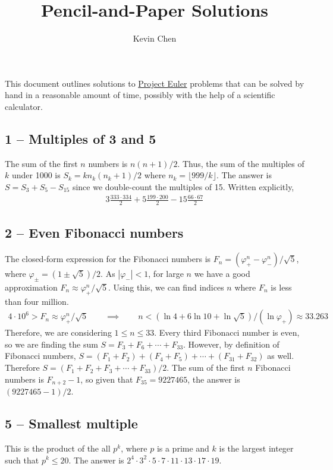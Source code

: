 \documentclass{article}
\title{Pencil-and-Paper Solutions}
\author{Kevin Chen}
\begin{document}
\maketitle

This document outlines solutions to \href{https://projecteuler.net/}{Project Euler} problems that can be solved by hand in a reasonable amount of time, possibly with the help of a scientific calculator. \\

\subsection*{1 -- Multiples of 3 and 5} 
The sum of the first $n$ numbers is $n(n+1)/2$. 
Thus, the sum of the multiples of $k$ under 1000 is $S_k = k n_k(n_k+1)/2$ where $n_k=\lfloor 999/k \rfloor$. 
The answer is $S = S_3 + S_5 - S_{15}$ since we double-count the multiples of 15.
Written explicitly,
\begin{align*}
	\boxed{ 3\frac{333 \cdot 334}{2} + 5\frac{199 \cdot 200}{2} - 15\frac{66 \cdot 67}{2} } 
\end{align*}


\subsection*{2 -- Even Fibonacci numbers} 
The closed-form expression for the Fibonacci numbers is $F_n = (\varphi_+^n - \varphi_-^n)/\sqrt{5}$, where $\varphi_\pm = (1\pm\sqrt{5})/2$.
As $|\varphi_-| < 1$, for large $n$ we have a good approximation $F_n \approx \varphi_+^n/\sqrt{5}$. 
Using this, we can find indices $n$ where $F_n$ is less than four million. 
\begin{align*}
	4 \cdot 10^6 > F_n \approx \varphi_+^n/\sqrt{5} \qquad\implies\qquad n < (\ln 4 + 6 \ln 10 + \ln \sqrt{5})/(\ln \varphi_+) \approx 33.263
\end{align*} 
Therefore, we are considering $1 \leq n \leq 33$. 
Every third Fibonacci number is even, so we are finding the sum $S = F_3 + F_6 + \cdots + F_{33}$. 
However, by definition of Fibonacci numbers, $S = (F_1 + F_2) + (F_4 + F_5) + \cdots + (F_{31} + F_{32})$ as well. 
Therefore $S = (F_1 + F_2 + F_3 + \cdots + F_{33})/2$. 
The sum of the first $n$ Fibonacci numbers is $F_{n+2} - 1$, so given that $F_{35} = 9227465$, the answer is $\boxed{ (9227465 - 1)/2 }$.


\subsection*{5 -- Smallest multiple} 
This is the product of the all $p^k$, where $p$ is a prime and $k$ is the largest integer such that $p^k \leq 20$.
The answer is $\boxed{ 2^4 \cdot 3^2 \cdot 5 \cdot 7 \cdot 11 \cdot 13 \cdot 17 \cdot 19}$.
\end{document}
